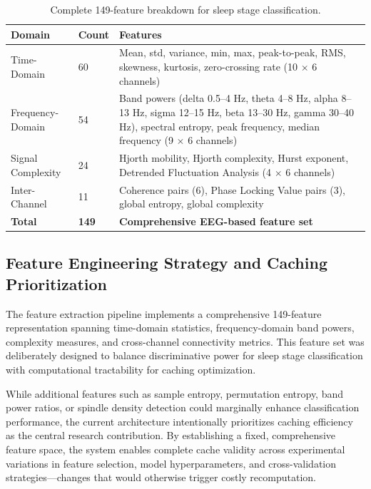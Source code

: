 \documentclass{imc-inf} %
\begin{document}
\begin{table}[ht]
\centering
\begin{tabular}{|p{3.5cm}|p{1.5cm}|p{7cm}|}
\hline
\textbf{Domain} & \textbf{Count} & \textbf{Features} \\
\hline
Time-Domain & 60 & Mean, std, variance, min, max, peak-to-peak, RMS, skewness, kurtosis, zero-crossing rate (10 $\times$ 6 channels) \\
\hline
Frequency-Domain & 54 & Band powers (delta 0.5--4 Hz, theta 4--8 Hz, alpha 8--13 Hz, sigma 12--15 Hz, beta 13--30 Hz, gamma 30--40 Hz), spectral entropy, peak frequency, median frequency (9 $\times$ 6 channels) \\
\hline
Signal Complexity & 24 & Hjorth mobility, Hjorth complexity, Hurst exponent, Detrended Fluctuation Analysis (4 $\times$ 6 channels) \\
\hline
Inter-Channel & 11 & Coherence pairs (6), Phase Locking Value pairs (3), global entropy, global complexity \\
\hline
\textbf{Total} & \textbf{149} & \textbf{Comprehensive EEG-based feature set} \\
\hline
\end{tabular}
\caption{Complete 149-feature breakdown for sleep stage classification.}
\label{tab:feature_breakdown_149}
\end{table}

\subsection{Feature Engineering Strategy and Caching Prioritization}

The feature extraction pipeline implements a comprehensive 149-feature representation spanning time-domain statistics, frequency-domain band powers, complexity measures, and cross-channel connectivity metrics. This feature set was deliberately designed to balance discriminative power for sleep stage classification with computational tractability for caching optimization.

While additional features such as sample entropy, permutation entropy, band power ratios, or spindle density detection could marginally enhance classification performance, the current architecture intentionally prioritizes caching efficiency as the central research contribution. By establishing a fixed, comprehensive feature space, the system enables complete cache validity across experimental variations in feature selection, model hyperparameters, and cross-validation strategies---changes that would otherwise trigger costly recomputation.
\end{document}
